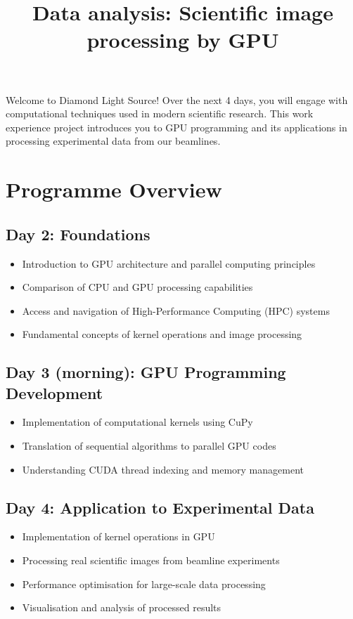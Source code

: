 \documentclass[11pt, a4paper]{article}
\title{Data analysis: Scientific image processing by GPU}
\author{}
\date{}
\begin{document}
\maketitle

Welcome to Diamond Light Source! Over the next 4 days, you will engage with
computational techniques used in modern scientific research. This work
experience project introduces you to GPU programming and its applications in
processing experimental data from our beamlines.

\section*{Programme Overview}

\subsection*{Day 2: Foundations}
\begin{itemize}
    \item Introduction to GPU architecture and parallel computing principles
    \item Comparison of CPU and GPU processing capabilities
    \item Access and navigation of High-Performance Computing (HPC) systems
    \item Fundamental concepts of kernel operations and image processing
\end{itemize}

\subsection*{Day 3 (morning): GPU Programming Development}
\begin{itemize}
    \item Implementation of computational kernels using CuPy
    \item Translation of sequential algorithms to parallel GPU codes
    \item Understanding CUDA thread indexing and memory management
\end{itemize}

\subsection*{Day 4: Application to Experimental Data}
\begin{itemize}
    \item Implementation of kernel operations in GPU
    \item Processing real scientific images from beamline experiments
    \item Performance optimisation for large-scale data processing
    \item Visualisation and analysis of processed results
\end{itemize}
\end{document}

